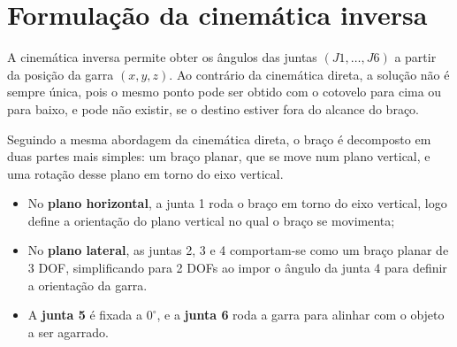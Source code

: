 \chapter{Formulação da cinemática inversa}
\label{ch:inv_kin}

A cinemática inversa permite obter os ângulos das juntas $(J1, \dots, J6)$ a partir da posição da garra $(x, y, z)$. 
Ao contrário da cinemática direta, a solução não é sempre única, pois o mesmo ponto pode ser obtido com o cotovelo para cima ou para baixo, e pode não existir, se o destino estiver fora do alcance do braço.

Seguindo a mesma abordagem da cinemática direta, o braço é decomposto em duas partes mais simples: um braço planar, que se move num plano vertical, e uma rotação desse plano em torno do eixo vertical.

\begin{itemize}
    \item No \textbf{plano horizontal}, a junta 1 roda o braço em torno do eixo vertical, logo define a orientação do plano vertical no qual o braço se movimenta;
    \item No \textbf{plano lateral}, as juntas 2, 3 e 4 comportam-se como um braço planar de 3 DOF, simplificando para 2 DOFs ao impor o ângulo da junta 4 para definir a orientação da garra. 
    \item A \textbf{junta 5} é fixada a $0^\circ$, e a \textbf{junta 6} roda a garra para alinhar com o objeto a ser agarrado.
\end{itemize}






